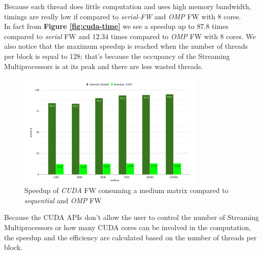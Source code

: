 Because each thread does little computation and uses high memory bandwidth, timings are really low if compared
to \emph{serial-FW} and \emph{OMP} FW with 8 cores. \\
In fact from \textbf{Figure \ref*{fig:cuda-time}} we see a speedup up to $87.8$ times compared to \emph{serial} FW
and $12.34$ times compared to \emph{OMP} FW with 8 cores. We also notice that the maximum speedup is reached when the number of threads per block is equal to 128;
that's because the occupancy of the Streaming Multiprocessors is at its peak and there are less wasted threads.
\begin{figure}[h!]
\centering                                                                        
\includegraphics[width=3.5in]{diagrams/cuda-speedup}
\captionsetup{justification=centering}                                                                                                                                   
\caption{Speedup of \emph{CUDA} FW consuming a medium matrix compared to \emph{sequential} and \emph{OMP} FW}                                                                                                                                            
\label{fig:cuda-speedup}                                                                                                                                                           
\end{figure}

Because the CUDA APIs don't allow the user to control the number of Streaming Multiprocessors or how many CUDA cores
can be involved in the computation, the speedup and the efficiency are calculated based on the number of threads per block.


